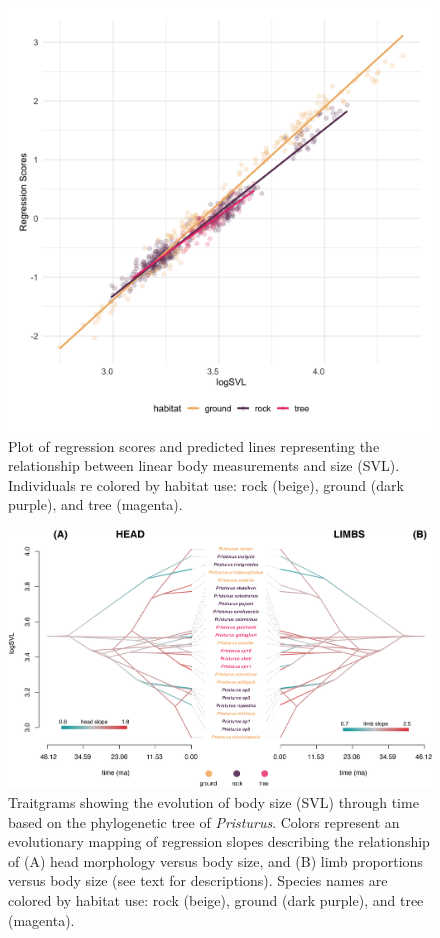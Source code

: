 \documentclass[
]{article}
\begin{document}
\begin{figure}
\includegraphics[width=1\linewidth]{Figs/figure_2_ggplot} \caption{Plot of regression scores and predicted lines representing the relationship between linear body measurements and size (SVL). Individuals re colored by habitat use: rock (beige), ground (dark purple), and tree (magenta).}\label{fig:unnamed-chunk-4}
\end{figure}

\newpage

\begin{figure}
\includegraphics[width=1\linewidth]{Figs/figure_phenograms} \caption{Traitgrams showing the evolution of body size (SVL) through time based on the phylogenetic tree of \textit{Pristurus}. Colors represent an evolutionary mapping of regression slopes describing the relationship of (A) head morphology versus body size, and (B) limb proportions versus body size (see text for descriptions). Species names are colored by habitat use: rock (beige), ground (dark purple), and tree (magenta).}\label{fig:unnamed-chunk-5}
\end{figure}
\end{document}
